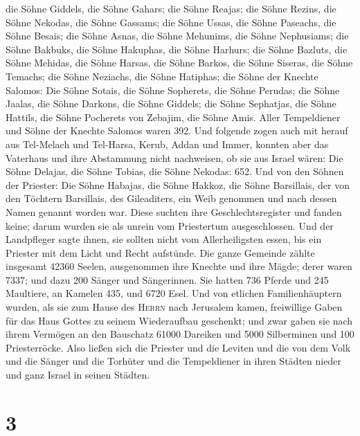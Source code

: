  die Söhne Giddels, die Söhne Gahars; die Söhne Reajas;
 die Söhne Rezins, die Söhne Nekodas, die Söhne Gassams;
 die Söhne Ussas, die Söhne Paseachs, die Söhne Besais;
 die Söhne Asnas, die Söhne Mehunims, die Söhne
Nephusiams;  die Söhne Bakbuks, die Söhne Hakuphas, die
Söhne Harhurs;  die Söhne Bazluts, die Söhne Mehidas, die
Söhne Harsas,  die Söhne Barkos, die Söhne Siseras, die
Söhne Temachs;  die Söhne Neziachs, die Söhne Hatiphas;
 die Söhne der Knechte Salomos: Die Söhne Sotais, die
Söhne Sopherets, die Söhne Perudas;  die Söhne Jaalas,
die Söhne Darkons, die Söhne Giddels;  die Söhne
Sephatjas, die Söhne Hattils, die Söhne Pocherets von Zebajim, die Söhne
Amis.  Aller Tempeldiener und Söhne der Knechte Salomos
waren 392.  Und folgende zogen auch mit herauf aus
Tel-Melach und Tel-Harsa, Kerub, Addan und Immer, konnten aber das
Vaterhaus und ihre Abstammung nicht nachweisen, ob sie aus Israel wären:
 Die Söhne Delajas, die Söhne Tobias, die Söhne Nekodas:
652.  Und von den Söhnen der Priester: Die Söhne Habajas,
die Söhne Hakkoz, die Söhne Barsillais, der von den Töchtern Barsillais,
des Gileaditers, ein Weib genommen und nach dessen Namen genannt worden
war.  Diese suchten ihre Geschlechtsregister und fanden
keine; darum wurden sie als unrein vom Priestertum ausgeschlossen.
 Und der Landpfleger sagte ihnen, sie sollten nicht vom
Allerheiligsten essen, bis ein Priester mit dem Licht und Recht
aufstünde.  Die ganze Gemeinde zählte insgesamt 42360
Seelen,  ausgenommen ihre Knechte und ihre Mägde; derer
waren 7337; und dazu 200 Sänger und Sängerinnen.  Sie
hatten 736 Pferde und 245 Maultiere,  an Kamelen 435, und
6720 Esel.  Und von etlichen Familienhäuptern wurden, als
sie zum Hause des \textsc{Herrn} nach Jerusalem kamen, freiwillige Gaben
für das Haus Gottes zu seinem Wiederaufbau geschenkt; 
und zwar gaben sie nach ihrem Vermögen an den Bauschatz 61000 Dareiken
und 5000 Silberminen und 100 Priesterröcke.  Also ließen
sich die Priester und die Leviten und die von dem Volk und die Sänger
und die Torhüter und die Tempeldiener in ihren Städten nieder und ganz
Israel in seinen Städten.

\hypertarget{section-2}{%
\section{3}\label{section-2}}

